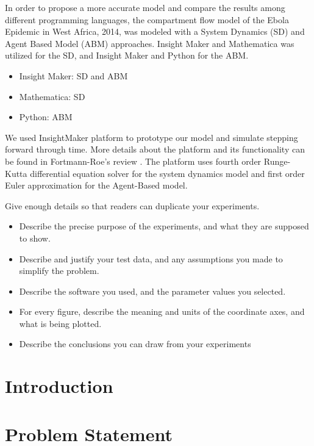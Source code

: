 \documentclass[10pt]{article}
\begin{document}
In order to propose a more accurate model and compare the results among different programming  languages, the compartment flow model of the Ebola Epidemic in West Africa, 2014, was modeled with a System Dynamics (SD) and Agent Based Model (ABM) approaches.  Insight Maker and Mathematica was utilized  for the SD, and Insight Maker and Python for the ABM.

\begin{itemize}
\item Insight Maker: SD and ABM
\item Mathematica: SD
\item Python: ABM
\end{itemize}
We used InsightMaker platform to prototype our model and simulate stepping forward through time. More details about the platform and its functionality can be found in Fortmann-Roe's review \cite{FortmannRoe}. The platform uses fourth order Runge-Kutta differential equation solver for the system dynamics model and  first order Euler approximation for the Agent-Based model.

Give enough details so that readers can duplicate your experiments.

\begin{itemize}
\item Describe the precise purpose of the experiments, and what they 
are supposed to show.

\item Describe and justify your test data, and any assumptions you made to 
simplify the problem.

\item Describe the software you used, and the 
parameter values you selected.

\item For every figure, describe the meaning and units of the coordinate axes, 
and what is being plotted.

\item Describe the conclusions you can draw from your experiments
\end{itemize}

\section{Introduction}



\section{Problem Statement}

\end{document}
